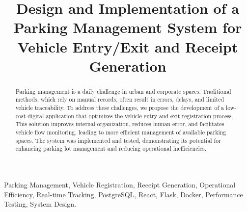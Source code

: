 \documentclass[journal]{IEEEtran}
\title{\LARGE \bf Design and Implementation of a Parking Management System for Vehicle Entry/Exit and Receipt Generation }
\begin{document}
\maketitle

\begin{abstract}
Parking management is a daily challenge in urban and corporate spaces. Traditional methods, which rely on manual records, often result in errors, delays, and limited vehicle traceability. To address these challenges, we propose the development of a low-cost digital application that optimizes the vehicle entry and exit registration process. This solution improves internal organization, reduces human error, and facilitates vehicle flow monitoring, leading to more efficient management of available parking spaces. The system was implemented and tested, demonstrating its potential for enhancing parking lot management and reducing operational inefficiencies.
\end{abstract}

\begin{IEEEkeywords}
Parking Management, Vehicle Registration, Receipt Generation, Operational Efficiency, Real-time Tracking, PostgreSQL, React, Flask, Docker, Performance Testing, System Design.
\end{IEEEkeywords}






%
\printbibliography
\end{document}
